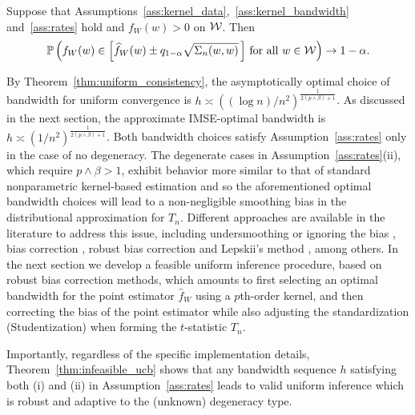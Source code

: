 \begin{theorem}
  \label{thm:infeasible_ucb}

  Suppose that Assumptions~\ref{ass:kernel_data},~\ref{ass:kernel_bandwidth}
  and~\ref{ass:rates} hold and
  $f_W(w) > 0$ on $\mathcal{W}$.
  Then
  \begin{align*}
    \mathbb{P}\left(
      f_W(w)
      \in
      \left[
        \widehat f_W(w)
        \pm
        q_{1-\alpha}
        \sqrt{\Sigma_n(w,w)}
        \, \right]
      \, \textup{for all }
      w \in \mathcal{W}
    \right)
    \to 1 - \alpha.
  \end{align*}
\end{theorem}

By Theorem~\ref{thm:uniform_consistency},
the asymptotically optimal choice of bandwidth
for uniform convergence is
$h \asymp ((\log n)/n^2)^{\frac{1}{2(p \wedge \beta)+1}}$.
As discussed in the next section, the approximate
IMSE-optimal bandwidth is
$h \asymp (1/n^2)^{\frac{1}{2(p \wedge \beta)+1}}$.
Both bandwidth choices satisfy Assumption~\ref{ass:rates}
only in the case of no degeneracy.
The degenerate cases in Assumption~\ref{ass:rates}(ii),
which require $p \wedge \beta > 1$,
exhibit behavior more similar to that of standard
nonparametric kernel-based estimation
and so the aforementioned optimal bandwidth
choices will lead to a non-negligible smoothing bias in the distributional
approximation for $T_n$.
Different approaches are available in the literature to address this issue,
including undersmoothing or ignoring the bias \citep{hall2001bootstrapping},
bias correction \citep{hall1992effect}, robust bias correction
\citep{Calonico-Cattaneo-Farrell_2018_JASA,
  Calonico-Cattaneo-Farrell_2022_Bernoulli}
and Lepskii's method \citep{lepskii1992asymptotically,birge2001alternative},
among others.
In the next section we develop a feasible uniform inference procedure,
based on robust bias correction methods,
which amounts to first selecting an optimal bandwidth for the point estimator
$\widehat{f}_W$ using a $p$th-order kernel,
and then correcting the bias of the point estimator while also adjusting
the standardization (Studentization) when forming the $t$-statistic $T_n$.

Importantly, regardless of the specific implementation details,
Theorem~\ref{thm:infeasible_ucb} shows that any bandwidth sequence $h$
satisfying both (i) and (ii)
in Assumption~\ref{ass:rates} leads to valid uniform inference which is robust
and adaptive to the (unknown) degeneracy type.


